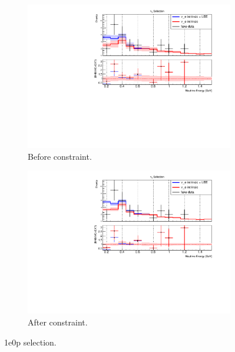 \begin{figure}[H] 
\begin{center}
    \begin{subfigure}[b]{0.45\textwidth}
    \centering
    \includegraphics[width=1.00\textwidth]{Fakedata/set4/1e0p_numu_reco_e_H1_mc_fakedata_set4_nue_before_data_constraint.pdf}
    \caption{\label{fig:fakedata:set4:zp_before_constrain} Before constraint.}
    \end{subfigure}
    \begin{subfigure}[b]{0.45\textwidth}
    \centering
    \includegraphics[width=1.00\textwidth]{Fakedata/set4/1e0p_numu_reco_e_H1_mc_fakedata_set4_univ_overlay_nue.pdf}
    \caption{\label{fig:fakedata:set4:zp_after_constrain} After constraint.}
    \end{subfigure}
\caption{\label{fig:fakedata:set4:zp_const} 1e0p selection.}
\end{center}
\end{figure}

